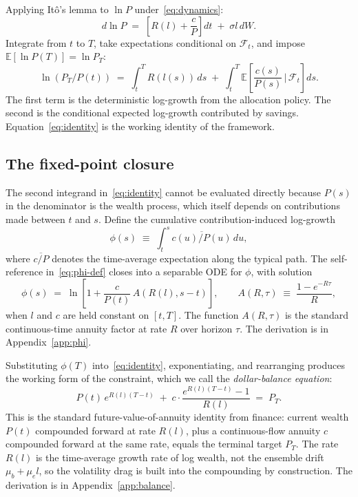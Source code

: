 \documentclass[11pt]{article}
\begin{document}
Applying It\^o's lemma to $\ln P$ under~\eqref{eq:dynamics}:
\begin{equation}
  \label{eq:dlnP}
  d\ln P \;=\; \left[R(l) + \frac{c}{P}\right]dt \;+\; \sigma l\, dW.
\end{equation}
Integrate from $t$ to $T$, take expectations conditional on
$\mathcal{F}_t$, and impose $\mathbb{E}[\ln P(T)] = \ln P_T$:
\begin{equation}
  \label{eq:identity}
  \ln(P_T/P(t)) \;=\; \int_t^T R(l(s))\,ds
  \;+\; \int_t^T \mathbb{E}\!\left[\frac{c(s)}{P(s)} \,\Big|\, \mathcal{F}_t\right]ds.
\end{equation}
The first term is the deterministic log-growth from the allocation
policy. The second is the conditional expected log-growth contributed
by savings. Equation~\eqref{eq:identity} is the working identity of
the framework.

\subsection{The fixed-point closure}

The second integrand in~\eqref{eq:identity} cannot be evaluated
directly because $P(s)$ in the denominator is the wealth process,
which itself depends on contributions made between $t$ and $s$.
Define the cumulative contribution-induced log-growth
\begin{equation}
  \label{eq:phi-def}
  \phi(s) \;\equiv\; \int_t^s \overline{c(u)/P(u)}\,du,
\end{equation}
where $\overline{c/P}$ denotes the time-average expectation along the
typical path. The self-reference in~\eqref{eq:phi-def} closes into a
separable ODE for $\phi$, with solution
\begin{equation}
  \label{eq:phi}
  \phi(s) \;=\; \ln\!\left[1 + \frac{c}{P(t)}\,A(R(l), s-t)\right],
  \qquad
  A(R, \tau) \;\equiv\; \frac{1 - e^{-R\tau}}{R},
\end{equation}
when $l$ and $c$ are held constant on $[t, T]$. The function $A(R,
\tau)$ is the standard continuous-time annuity factor at rate $R$
over horizon $\tau$. The derivation is in Appendix~\ref{app:phi}.

Substituting $\phi(T)$ into~\eqref{eq:identity}, exponentiating, and
rearranging produces the working form of the constraint, which we
call the \emph{dollar-balance equation}:
\begin{equation}
  \label{eq:balance}
  \boxed{
  P(t)\, e^{R(l)(T-t)}
  \;+\; c\cdot \frac{e^{R(l)(T-t)} - 1}{R(l)}
  \;=\; P_T.
  }
\end{equation}
This is the standard future-value-of-annuity identity from finance:
current wealth $P(t)$ compounded forward at rate $R(l)$, plus a
continuous-flow annuity $c$ compounded forward at the same rate,
equals the terminal target $P_T$. The rate $R(l)$ is the time-average
growth rate of log wealth, not the ensemble drift $\mu_b + \mu_e l$,
so the volatility drag is built into the compounding by construction.
The derivation is in Appendix~\ref{app:balance}.
\end{document}

